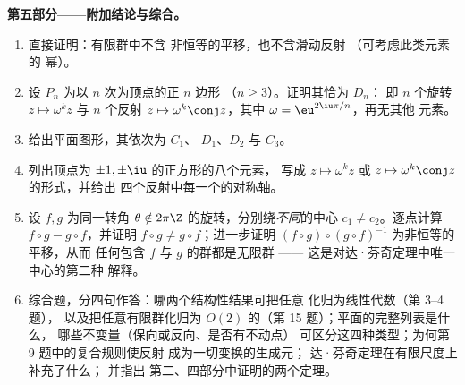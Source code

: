 \begin{problem}
\medskip
\noindent\textbf{第五部分——附加结论与综合。}
\begin{enumerate}[resume]
  \item 直接证明：有限群中不含
        非恒等的平移，也不含滑动反射
        （可考虑此类元素的
        幂）。
  \item 设 $P_n$ 为以 $n$ 次为顶点的正 $n$ 边形
        （$n \geq 3$）。证明其恰为 $D_n$：
        即 $n$ 个旋转 $z
        \mapsto \omega^k z$ 与 $n$ 个反射 $z \mapsto
        \omega^k \conj z$，其中 $\omega = \eu^{2\iu\pi/n}$，再无其他
        元素。
  \item 给出平面图形，其依次为 $C_1$、
        $D_1$、$D_2$ 与 $C_3$。
  \item 列出顶点为 $\pm1, \pm\iu$ 的正方形的八个元素，
        写成 $z \mapsto
        \omega^k z$ 或 $z \mapsto \omega^k\conj z$ 的形式，并给出
        四个反射中每一个的对称轴。
  \item 设 $f, g$ 为同一转角 $\theta
        \notin 2\pi\Z$ 的旋转，分别绕\emph{不同}的中心 $c_1 \neq
        c_2$。逐点计算 $f\circ g - g\circ f$，并证明
        $f\circ g \neq g\circ f$；进一步证明 $(f \circ
        g)\circ(g\circ f)^{-1}$ 为非恒等的平移，从而
        任何包含 $f$ 与 $g$ 的群都是无限群 ——
        这是对达·芬奇定理中唯一中心的第二种
        解释。
  \item 综合题，分四句作答：哪两个结构性结果可把任意
        化归为线性代数（第 3--4 题），
        以及把任意有限群化归为
        $O(2)$ 的（第 15 题）；平面的完整列表是什么，
        哪些不变量（保向或反向、是否有不动点）
        可区分这四种类型；为何第 9 题中的复合规则使反射
        成为一切变换的生成元；
        达·芬奇定理在有限尺度上补充了什么；
        并指出
        第二、四部分中证明的两个定理。
\end{enumerate}
\end{problem}

